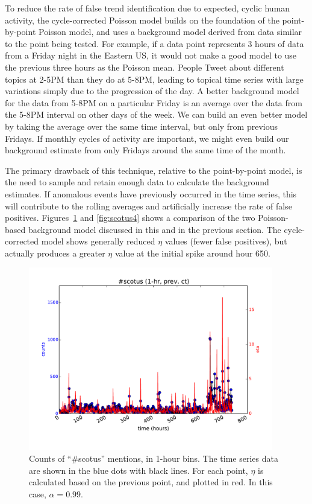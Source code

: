 \documentclass{article}
\begin{document}
To reduce the rate of false trend identification due to expected, cyclic human
activity, the cycle-corrected Poisson model builds on the foundation of the
point-by-point Poisson model, and uses a background model derived from data
similar to the point being tested. For example, if a data point represents 3
hours of data from a Friday night in the Eastern US, it would not make a good
model to use the previous three hours as the Poisson mean. People Tweet about
different topics at 2-5PM than they do at 5-8PM, leading to topical time series
with large variations simply due to the progression of the day. A better
background model for the data from 5-8PM on a particular Friday is an average
over the data from the 5-8PM interval on other days of the week. We can build
an even better model by taking the average over the same time interval, but
only from previous Fridays. If monthly cycles of activity are important, we
might even build our background estimate from only Fridays around the same time
of the month. 

The primary drawback of this technique, relative to the point-by-point model,
is the need to sample and retain enough data to calculate the background
estimates. If anomalous events have previously occurred in the time series,
this will contribute to the rolling averages and artificially increase the rate
of false positives. Figures~\ref{fig:scotus3} and \ref{fig:scotus4} shows a comparison of the two Poisson-based
background model discussed in this and in the previous section. The
cycle-corrected model shows generally reduced $\eta$ values (fewer false
positives), but actually produces a greater $\eta$ value at the initial spike
around hour 650. 

\begin{figure}
\begin{center}
\includegraphics[width=0.95\textwidth]{fig/scotus_1month_pbppm.pdf}
\caption{Counts of ``\#scotus'' mentions, in 1-hour bins. The time series
data are shown in the blue dots with black lines. For each point, $\eta$ is
calculated based on the previous point, and plotted in red. In this case, 
$\alpha=0.99$.} \label{fig:scotus3}
\end{center}
\end{figure}
\end{document}
